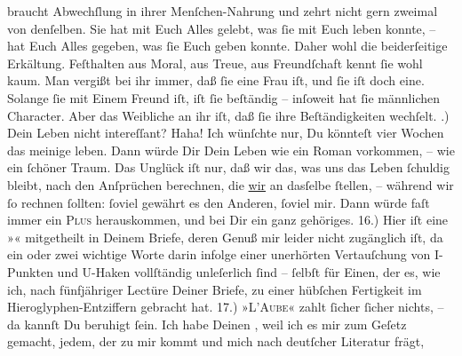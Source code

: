 \begin{ledgroupsized}[t]{13cm}
               braucht Abwechſlung in \strikeout{\textcolor{gray}{al}} ihrer Menſchen-Nahrung und zehrt nicht gern zweimal von denſelben. Sie hat mit
               Euch Alles gelebt, was ſie mit Euch leben konnte, – hat Euch Alles gegeben, was ſie
               Euch geben konnte. Daher wohl die beiderſeitige Erkältung. Feſthalten aus Moral, aus
               Treue, aus Freundſchaft {\pb}kennt ſie wohl kaum.  Man vergißt bei ihr immer, daß ſie eine Frau iſt, und ſie iſt doch eine.
               Solange ſie mit Einem Freund iſt, iſt ſie beſtändig – inſoweit hat ſie männlichen
               Character. Aber das Weibliche an ihr iſt, daß ſie ihre Beſtändigkeiten wechſelt.\pend
           .) Dein Leben nicht intereſſant? Haha! Ich wünſchte nur, Du könnteſt vier Wochen
               das  meinige leben. {\pb}Dann würde  Dir Dein Leben wie ein Roman vorkommen, – wie ein ſchöner Traum. Das Unglück
               iſt nur, daß \strikeout{\textcolor{gray}{m}} wir das, was uns das Leben ſchuldig bleibt, nach den Anſprüchen berechnen, die
                  \uline{wir} an dasſelbe ſtellen, – während wir ſo rechnen
               ſollten: ſoviel gewährt es den Anderen, ſoviel mir. Dann würde faſt immer ein \textsc{Plus} herauskommen, und bei Dir ein ganz gehöriges.\pend
           \pstart
           {\pb}16.) Hier iſt eine »\label{K_L02774-9v}\label{K_L02774-9h}« mitgetheilt in Deinem Briefe, deren Genuß mir leider nicht zugänglich iſt,
               da ein oder zwei wichtige Worte darin infolge einer unerhörten Vertauſchung von
               I-Punkten und U-Haken vollſtändig unleſerlich ſind – ſelbſt für Einen, der  es, wie ich, nach fünfjähriger Lectüre
               Deiner Briefe, zu einer hübſchen Fertigkeit im Hieroglyphen-Entziffern gebracht
               hat.\pend
           \pstart
           {\pb}17.) »\textsc{L’Aube}« zahlt ſicher ſicher nichts, – da kannſt Du beruhigt ſein. Ich habe Deinen
                  \label{K_L02774-10v}\label{K_L02774-10h}, weil ich es mir zum Geſetz \strikeout{\textcolor{gray}{ma}} gemacht, jedem, der zu mir kommt und mich nach deutſcher Literatur frägt,

\end{ledgroupsized}
